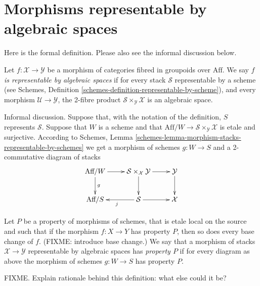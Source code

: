 \section{Morphisms representable by algebraic spaces}
\label{section-morphism-representable-by-algebraic-spaces}

\noindent
Here is the formal definition. Please also see the informal discussion below.

\begin{definition}
\label{definition-representable-by-algebraic-spaces}
Let $f : \mathcal{X} \to \mathcal{Y}$ be a morphism of categories
fibred in groupoids over $\text{Aff}$. We say
{\it $f$ is representable by algebraic spaces}
if for every stack $\mathcal{S}$ representable by a scheme
(see Schemes, Definition \ref{schemes-definition-representable-by-scheme}),
and every morphism $\mathcal{U} \to \mathcal{Y}$, the 2-fibre product
$\mathcal{S}\times_\mathcal{Y}\mathcal{X}$ is an algebraic space.
\end{definition}

\noindent
Informal discussion. Suppose that, with the notation of the definition,
$S$ represents $\mathcal{S}$. Suppose that $W$ is a scheme and that
$\text{Aff}/W \to \mathcal{S}\times_\mathcal{Y}\mathcal{X}$ is 
etale and surjective. According to
Schemes, Lemma \ref{schemes-lemma-morphism-stacks-representable-by-schemes}
we get a morphism of schemes $g : W \to S$ and a 2-commutative diagram
of stacks
$$
\xymatrix{
\text{Aff}/W \ar[d]^g \ar[r] &
\mathcal{S}\times_\mathcal{X}\mathcal{Y} \ar[d] \ar[r] &
\mathcal{Y} \ar[d] \\
\text{Aff}/S &
\mathcal{S} \ar[l]^j \ar[r] & \mathcal{X}
}
$$

\begin{definition}
\label{definition-property-morphism-representable-by-algebraic-spaces}
Let $P$ be a property of morphisms of schemes, that is etale local
on the source and such that if the morphism $f : X \to Y$ has property $P$,
then so does every base change of $f$. (FIXME: introduce base change.)
We say that a morphism of stacks $\mathcal{X}
\to \mathcal{Y}$ representable by algebraic spaces has
{\it property $P$} if for every diagram as above the morphism of schemes
$g : W \to S$ has property $P$.
\end{definition}

\noindent
FIXME. Explain rationale behind this definition: what else could it be?







